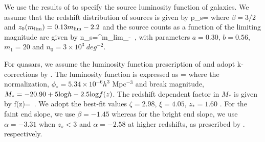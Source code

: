 \documentclass[useAMS,usenatbib,a4paper]{mn2e}
\begin{document}


We use the results of \citet{Faure2009} to specify the source luminosity
function of galaxies. We assume that the redshift distribution of sources is
given by
\be
\label{eqn:ps}
p_s=
\ee
where $\beta=3/2$ and $z_0(m_{\rm lim})=0.13m_{\rm lim} - 2.2$ and the source
counts as a function of the limiting magnitude are given by
\be
\label{eqn:ns}
n_s=\int^{m_{\rm lim}}_{-\infty} 
\,,
\ee
with parameters $a=0.30$, $b=0.56$, $m_1=20$ and $n_0=3\times10^3~deg^{-2}$.

For quasars, we assume the luminosity function prescription of \citep{Oguri2010}
and adopt k-corrections by \citep{Richards2006}.
The luminosity function is expressed as
\be
{}=
\ee
where the normalization, $\phi_{*}=5.34\times10^{-6} h^3$ Mpc$^{-3}$ and break
magnitude, $M_*=-20.90 + 5 {\rm log} h - 2.5 {\rm log} f(z)$. The redshift
dependent factor in $M_*$ is given by
\be
f(z)= \,.
\ee
We adopt the best-fit values $\zeta=2.98$, $\xi=4.05$, $z_{*}=1.60$
\citep{Oguri2010}. For the faint end slope, we use $\beta=-1.45$ whereas for
the bright end slope, we use $\alpha=-3.31$ when $z_s<3$ and $\alpha=-2.58$ at
higher redshifts, as prescribed by \citep{Oguri2010}.
respectively.
\end{document}
